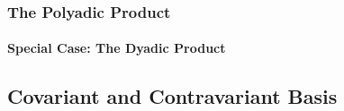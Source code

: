 \subsubsection{The Polyadic Product}

\paragraph{Special Case: The Dyadic Product}












\subsection{Covariant and Contravariant Basis}



